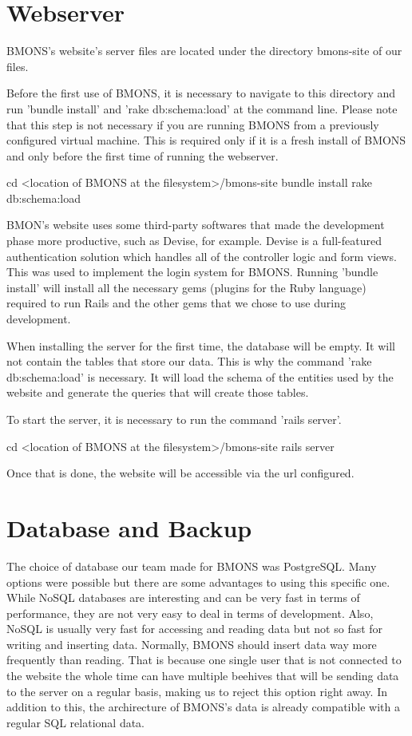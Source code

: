 \clearpage
\section{Webserver}

BMONS's website's server files are located under the directory bmons-site of our files. 

Before the first use of BMONS, it is necessary to navigate to this directory and run 'bundle install' and 'rake db:schema:load' at the command line. Please note that this step is not necessary if you are running BMONS from a previously configured virtual machine. This is required only if it is a fresh install of BMONS and only before the first time of running the webserver.

\indent cd <location of BMONS at the filesystem>/bmons-site
\indent bundle install
\indent rake db:schema:load

BMON's website uses some third-party softwares that made the development phase more productive, such as Devise, for example. Devise is a full-featured authentication solution which handles all of the controller logic and form views. This was used to implement the login system for BMONS. Running 'bundle install' will install all the necessary gems (plugins for the Ruby language) required to run Rails and the other gems that we chose to use during development. 

When installing the server for the first time, the database will be empty. It will not contain the tables that store our data. This is why the command 'rake db:schema:load' is necessary. It will load the schema of the entities used by the website and generate the queries that will create those tables.

To start the server, it is necessary to run the command 'rails server'.

\indent cd <location of BMONS at the filesystem>/bmons-site
\indent rails server

Once that is done, the website will be accessible via the url configured.

\clearpage
\section{Database and Backup}

The choice of database our team made for BMONS was PostgreSQL. Many options were possible but there are some advantages to using this specific one. While NoSQL databases are interesting and can be very fast in terms of performance, they are not very easy to deal in terms of development. Also, NoSQL is usually very fast for accessing and reading data but not so fast for writing and inserting data. Normally, BMONS should insert data way more frequently than reading. That is because one single user that is not connected to the website the whole time can have multiple beehives that will be sending data to the server on a regular basis, making us to reject this option right away. In addition to this, the archirecture of BMONS's data is already compatible with a regular SQL relational data.

